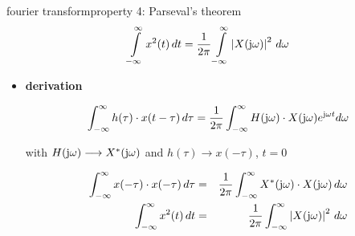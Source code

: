         \begin{frame}{fourier transform}{property 4: Parseval's theorem}
            \begin{equation*}
                \int\limits_{-\infty}^{\infty}{x^2(t)\, dt} = \frac{1}{2\pi}\int\limits_{-\infty}^{\infty} {\left|X(\mathrm{j}\omega)\right|^2\, d\omega} 
            \end{equation*}
            \pause
            \begin{itemize}
                \item[]	\textbf{derivation}
                \begin{footnotesize}
                    \begin{equation*}
                        \int_{-\infty}^{\infty}{h(\tau)\cdot x(t-\tau)\, d\tau} = \frac{1}{2\pi}\int_{-\infty}^{\infty} {H(\mathrm{j}\omega)\cdot X(\mathrm{j}\omega) {e}^{\mathrm{j}\omega t} d\omega}\nonumber
                    \end{equation*}
                    
                    \centering with $H(\mathrm{j}\omega) \longrightarrow X^\ast (\mathrm{j}\omega)$ and $h(\tau)\longrightarrow x(-\tau)$, $t = 0$
                    
                    \pause
                    \begin{eqnarray*}
                        \int_{-\infty}^{\infty}{x(-\tau)\cdot x(-\tau)\, d\tau} &=& \frac{1}{2\pi}\int_{-\infty}^{\infty} {X^\ast (\mathrm{j}\omega)\cdot X(\mathrm{j}\omega) \, d\omega}\nonumber\\
                        \int_{-\infty}^{\infty}{x^2(t)\, dt} &=& \frac{1}{2\pi}\int_{-\infty}^{\infty} {\left|X(\mathrm{j}\omega)\right|^2\, d\omega} \nonumber
                    \end{eqnarray*}
                \end{footnotesize}
            \end{itemize}
        \end{frame}	

